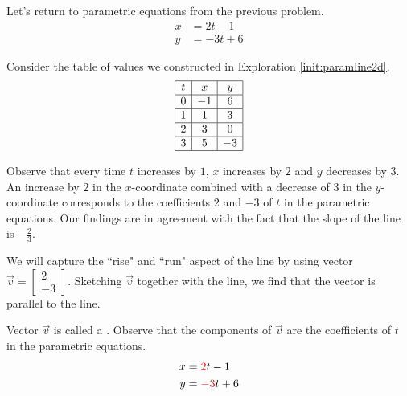 \documentclass{ximera}
\begin{document}
\begin{exploration}\label{init:paramline2dpart3}
Let's return to parametric equations from the previous problem.
\begin{align*}
x&=2t-1\\
y&=-3t+6
\end{align*}

Consider the table of values we constructed in Exploration \ref{init:paramline2d}.
$$\begin{array}{|c|c|c|}  
 \hline t& x & y\\ 
 \hline 0 & -1 & 6\\ 
 \hline 1 & 1 & 3 \\
 \hline 2 & 3& 0\\
 \hline 3 & 5& -3\\
 \hline
 \end{array}$$

Observe that every time $t$ increases by $1$, $x$ increases by $2$ and $y$ decreases by $3$.  An increase by $2$ in the $x$-coordinate combined with a decrease of $3$ in the $y$-coordinate corresponds to the coefficients $2$ and $-3$ of $t$ in the parametric equations.  Our findings are in agreement with the fact that the slope of the line is $-\frac{2}{3}$.  

We will capture the ``rise" and ``run" aspect of the line by using vector $\vec{v}=\begin{bmatrix}2\\-3\end{bmatrix}$. Sketching $\vec{v}$ together with the line, we find that the vector is parallel to the line.  

 \begin{center}
\end{center}

Vector $\vec{v}$ is called a .  Observe that the components of $\vec{v}$ are the coefficients of $t$ in the parametric equations.
\begin{align*}
x&={\color{red}2}t-1\\
y&={\color{red}-3}t+6
\end{align*}


\end{exploration}
\end{document}
